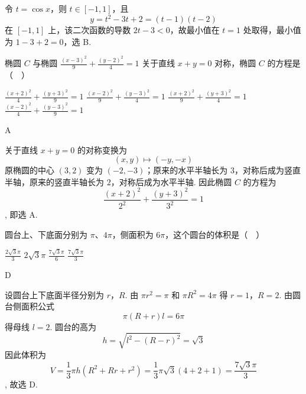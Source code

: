 \documentclass[UTF8,a4paper,oneside,11pt]{ctexbook}
\begin{document}
\begin{solution}
令 \(t=\cos x\)，则 \(t\in[-1,1]\)，且
\[
y=t^2-3t+2=(t-1)(t-2)
\]
在 \([-1,1]\) 上，该二次函数的导数 \(2t-3<0\)，故最小值在 \(t=1\) 处取得，最小值为 \(1-3+2=0\)，选 B.
\end{solution}

\begin{problem}
椭圆 \(C\) 与椭圆 \(\frac{(x - 3)^2}{9} + \frac{(y - 2)^2}{4} = 1\) 关于直线 \(x + y = 0\) 对称，椭圆 \(C\) 的方程是（\(\quad\)）

\choices
    {\(\frac{(x + 2)^2}{4} +\frac{(y + 3)^2}{9} = 1\)}
    {\(\frac{(x - 2)^2}{9} +\frac{(y - 3)^2}{4} = 1\)}
    {\(\frac{(x + 2)^2}{9} +\frac{(y + 3)^2}{4} = 1\)}
    {\(\frac{(x - 2)^2}{4} +\frac{(y - 3)^2}{9} = 1\)}

\end{problem}

\begin{answer}
A
\end{answer}

\begin{solution}
关于直线 \(x+y=0\) 的对称变换为
\[
(x,y)\longmapsto(-y,-x)
\]
原椭圆的中心 \((3,2)\) 变为 \((-2,-3)\)；原来的水平半轴长为 \(3\)，对称后成为竖直半轴，原来的竖直半轴长为 \(2\)，对称后成为水平半轴. 因此椭圆 \(C\) 的方程为
\[
\frac{(x+2)^2}{2^2}+\frac{(y+3)^2}{3^2}=1
\],
即选 A.
\end{solution}

\begin{problem}
圆台上、下底面分别为 \(\pi\)、\(4\pi\)，侧面积为 \(6\pi\)，这个圆台的体积是（\(\quad\)）

\choices
    {\(\frac{2\sqrt{3}\pi}{3}\)}
    {\(2\sqrt{3}\pi\)}
    {\(\frac{7\sqrt{3}\pi}{6}\)}
    {\(\frac{7\sqrt{3}\pi}{3}\)}

\end{problem}

\begin{answer}
D
\end{answer}

\begin{solution}
设圆台上下底面半径分别为 \(r\)，\(R\). 由 \(\pi r^2=\pi\) 和 \(\pi R^2=4\pi\) 得 \(r=1\)，\(R=2\). 由圆台侧面积公式
\[
\pi(R+r)l=6\pi
\]
得母线 \(l=2\). 圆台的高为
\[
h=\sqrt{l^2-(R-r)^2}=\sqrt3
\]
因此体积为
\[
V=\frac13\pi h(R^2+Rr+r^2)
=\frac13\pi\sqrt3(4+2+1)
=\frac{7\sqrt3\pi}{3}
\],
故选 D.
\end{solution}
\end{document}
